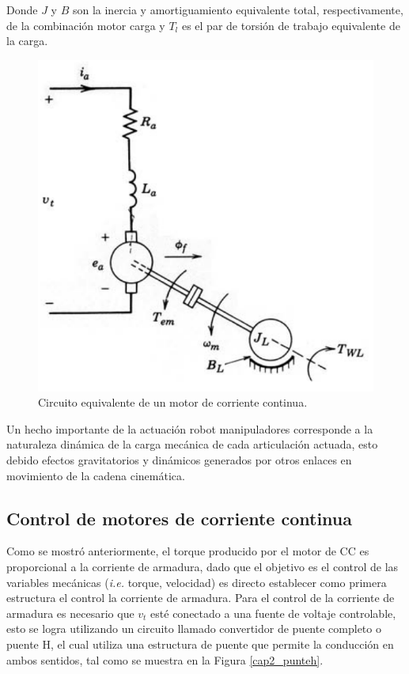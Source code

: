 Donde $J$ y $B$ son la inercia y amortiguamiento equivalente total, respectivamente, de la combinación motor carga y $T_l$ es el par de torsión de trabajo equivalente de la carga.

\begin{figure}[H]
  \centering
  \includegraphics[scale=0.3]{img/cap2/dc_motor_circuit}
  \caption{Circuito equivalente de un motor de corriente continua.}
  \label{cap2_dc_motor}
\end{figure}

Un hecho importante de la actuación robot manipuladores corresponde a la naturaleza dinámica de la carga mecánica de cada articulación actuada, esto debido efectos gravitatorios y dinámicos generados por otros enlaces en movimiento de la cadena cinemática.


\subsection{Control de motores de corriente continua}

Como se mostró anteriormente, el torque producido por el motor de CC es proporcional a la corriente de armadura, dado que el objetivo es el control de las variables mecánicas (\textit{i.e.} torque, velocidad) es directo establecer como primera estructura el control la corriente de armadura. Para el control de la corriente de armadura es necesario que $v_t$ esté conectado a una fuente de voltaje controlable, esto se logra utilizando un circuito llamado convertidor de puente completo o puente H, el cual utiliza una estructura de puente que permite la conducción en ambos sentidos, tal como se muestra en la Figura \ref{cap2_punteh}.

